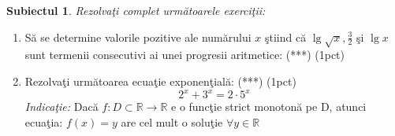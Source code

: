 \documentclass[a4paper, 12pt]{scrartcl}
\theoremstyle{plain}
\newtheorem{subiect}{Subiectul}
\newcommand{\Subiect}[1]{
    {
        \large
        \begin{subiect}
            #1
        \end{subiect}
    }
}
\begin{document}
\Subiect{Rezolva\c ti complet urm\u atoarele exerci\c tii:}
\begin{enumerate}[label=\textbf{\arabic*})]
    \item {
        S\u a se determine valorile pozitive ale num\u arului \(x\) \c stiind c\u a \( \lg \sqrt{x}, \frac{3}{2} \) \c 
        si \( \lg x \) sunt termenii consecutivi ai unei progresii aritmetice: (***) \hfill (1pct)
    }
    \item {
        Rezolva\c ti urm\u atoarea ecua\c tie exponen\c tial\u a: (***) \hfill (1pct)
        \[
            2^x + 3^x = 2 \cdot 5^x    
        \]    
        \textit{Indica\c tie:} Dac\u a \( f:D \subset \mathbb{R} \rightarrow \mathbb{R} \) e o func\c tie strict monoton\u a pe D,
        atunci ecua\c tia: \( f(x) = y \) are cel mult o solu\c tie \( \forall y \in \mathbb{R} \) 
    }
\end{enumerate}
\end{document}
